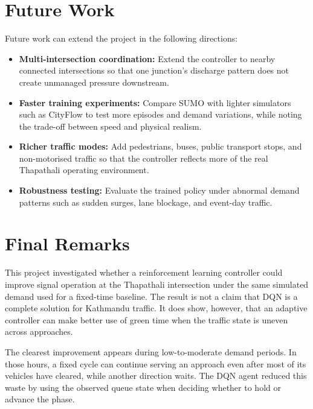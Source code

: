 \section{Future Work}
\label{sec:future_work}

Future work can extend the project in the following directions:

\begin{itemize}
  \item \textbf{Multi-intersection coordination:} Extend the controller to nearby connected intersections so that one junction's discharge pattern does not create unmanaged pressure downstream.
  \item \textbf{Faster training experiments:} Compare SUMO with lighter simulators such as CityFlow to test more episodes and demand variations, while noting the trade-off between speed and physical realism.
  \item \textbf{Richer traffic modes:} Add pedestrians, buses, public transport stops, and non-motorised traffic so that the controller reflects more of the real Thapathali operating environment.
  \item \textbf{Robustness testing:} Evaluate the trained policy under abnormal demand patterns such as sudden surges, lane blockage, and event-day traffic.
\end{itemize}

\section{Final Remarks}
\label{sec:final_remarks}

This project investigated whether a reinforcement learning controller
could improve signal operation at the Thapathali intersection under
the same simulated demand used for a fixed-time baseline. The result is
not a claim that DQN is a complete solution for Kathmandu traffic. It
does show, however, that an adaptive controller can make better use of
green time when the traffic state is uneven across approaches.

The clearest improvement appears during low-to-moderate demand periods.
In those hours, a fixed cycle can continue serving an approach even
after most of its vehicles have cleared, while another direction waits.
The DQN agent reduced this waste by using the observed queue state when
deciding whether to hold or advance the phase.

